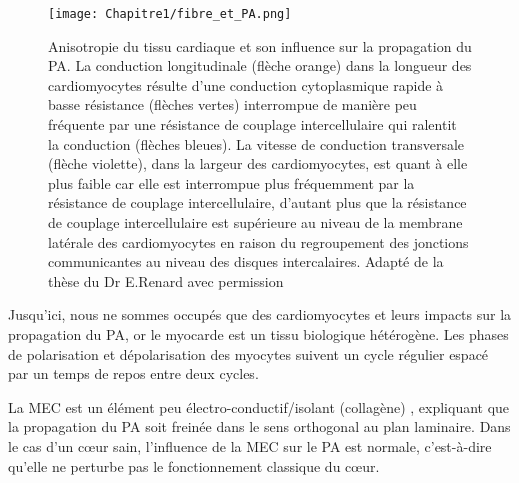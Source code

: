 \begin{figure}[!htbp]
  \begin{center}
    \texttt{[image: Chapitre1/fibre\_et\_PA.png]}
  \end{center}
  \caption{Anisotropie du tissu cardiaque et son influence sur la propagation du PA. La conduction longitudinale (flèche orange) dans la longueur des cardiomyocytes résulte d’une conduction cytoplasmique rapide à basse résistance (flèches vertes) interrompue de manière peu fréquente par une résistance de couplage intercellulaire qui ralentit la conduction (flèches bleues). La vitesse de conduction transversale (flèche violette), dans la largeur des cardiomyocytes, est quant à elle plus faible car elle est interrompue plus fréquemment par la résistance de couplage intercellulaire, d’autant plus que la résistance de couplage intercellulaire est supérieure au niveau de la membrane latérale des cardiomyocytes en raison du regroupement des jonctions communicantes au niveau des disques intercalaires. Adapté de la thèse du Dr E.Renard avec permission\cite{renard:tel-04344684}}
  \label{fig:fig_fibre_et_PA}
\end{figure}

\clearpage

Jusqu’ici, nous ne sommes occupés que des cardiomyocytes et leurs impacts sur la propagation du PA, or le myocarde est un tissu biologique hétérogène. Les phases de polarisation et dépolarisation des myocytes suivent un cycle régulier espacé par un temps de repos entre deux cycles.

La MEC est un élément peu électro-conductif/isolant (collagène) \cite{Zannad2005}, expliquant que la propagation du PA soit freinée dans le sens orthogonal au plan laminaire. Dans le cas d’un cœur sain, l’influence de la MEC sur le PA est normale, c’est-à-dire qu’elle ne perturbe pas le fonctionnement classique du cœur.

